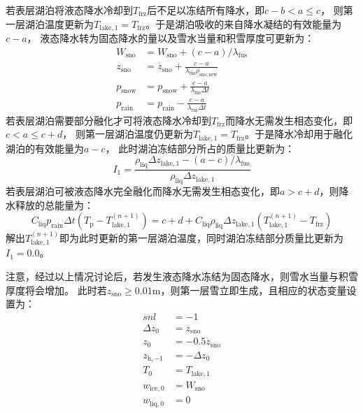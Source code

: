 若表层湖泊将液态降水冷却到$T_{\mathrm {frz}} $后不足以冻结所有降水，即$c-b<a\leqslant c$，
则第一层湖泊温度更新为$T_{\mathrm{lake,1}}=T_{\mathrm {frz}} $。于是湖泊吸收的来自降水凝结的有效能量为$c-a$，
液态降水转为固态降水的量以及雪水当量和积雪厚度可更新为：
\begin{equation}
  \begin{aligned}
    W_{\mathrm{sno}} &= W_{\mathrm{sno}} + (c-a) / \lambda_{\mathrm {fus}}  \\
    z_{\mathrm{sno}} &= z_{\mathrm{sno}} + \frac{c-a}{\lambda_{\mathrm {fus}}  \rho_{\mathrm{sno,new}}} \\
    p_{\mathrm {snow}}  &= p_{\mathrm {snow}}  + \frac{c-a}{\lambda_{\mathrm {fus}}  \Delta t} \\
    p_{\mathrm {rain}}  &= p_{\mathrm {rain}}  - \frac{c-a}{\lambda_{\mathrm {fus}}  \Delta t}
  \end{aligned}
\end{equation}
若表层湖泊需要部分融化才可将液态降水冷却到$T_{\mathrm {frz}} $而降水无需发生相态变化，即$c<a\leqslant c+d$，
则第一层湖泊温度仍更新为$T_{\mathrm{lake,1}}=T_{\mathrm {frz}} $。于是降水冷却用于融化湖泊的有效能量为$a-c$，
此时湖泊冻结部分所占的质量比更新为：
\begin{equation}
  I_{1}=\frac{\rho_{\mathrm{liq}} \Delta z_{\mathrm{lake, 1}}-(a-c) / \lambda_{\mathrm {fus}}}{\rho_{\mathrm{liq}} \Delta z_{\mathrm{lake, 1}}}
\end{equation}
若表层湖泊可被液态降水完全融化而降水无需发生相态变化，即$a>c+d$，则降水释放的总能量为：
\begin{equation}
  C_{\mathrm{liq}} p_{\mathrm {rain}} \Delta t\left(T_{\mathrm{p}}-T_{\mathrm{lake, 1}}^{(n+1)}\right)=c+d+C_{\mathrm{liq}} \rho_{\mathrm{liq}} \Delta z_{\mathrm{lake, 1}}\left(T_{\mathrm{lake, 1}}^{(n+1)}-T_{\mathrm {frz}}\right)
\end{equation}
解出$T_{\mathrm{lake,1}}^{\left(n+1\right)}$即为此时更新的第一层湖泊温度，同时湖泊冻结部分质量比更新为$I_1=0.0$。


注意，经过以上情况讨论后，若发生液态降水冻结为固态降水，则雪水当量与积雪厚度将会增加。
此时若$z_{\mathrm{sno}}\geqslant 0.01$m，则第一层雪立即生成，且相应的状态变量设置为：
\begin{equation}
  \begin{aligned}
    snl &= -1 \\
    \Delta z_{0} &= z_{\mathrm{sno}} \\
    z_{0} &= -0.5 z_{\mathrm{sno}} \\
    z_{\mathrm{h,-1}} &= -\Delta z_{0} \\
    T_{0} &= T_{\mathrm{lake, 1}} \\
    w_{\mathrm{ice, 0}} &= W_{\mathrm{sno}} \\
    w_{\mathrm{liq, 0}} &= 0
  \end{aligned}
\end{equation}

